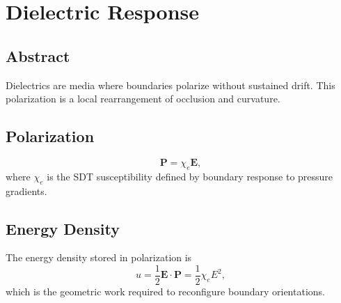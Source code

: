 \documentclass[12pt]{book}
\begin{document}
\chapter{Dielectric Response}

\section*{Abstract}
Dielectrics are media where boundaries polarize without sustained drift. This polarization is a local
rearrangement of occlusion and curvature.

\section{Polarization}
\begin{equation}
\mathbf{P} = \chi_e \mathbf{E},
\end{equation}
where $\chi_e$ is the SDT susceptibility defined by boundary response to pressure gradients.

\section{Energy Density}
The energy density stored in polarization is
\begin{equation}
u = \frac{1}{2}\mathbf{E}\cdot\mathbf{P} = \frac{1}{2}\chi_e E^2,
\end{equation}
which is the geometric work required to reconfigure boundary orientations.
\end{document}

